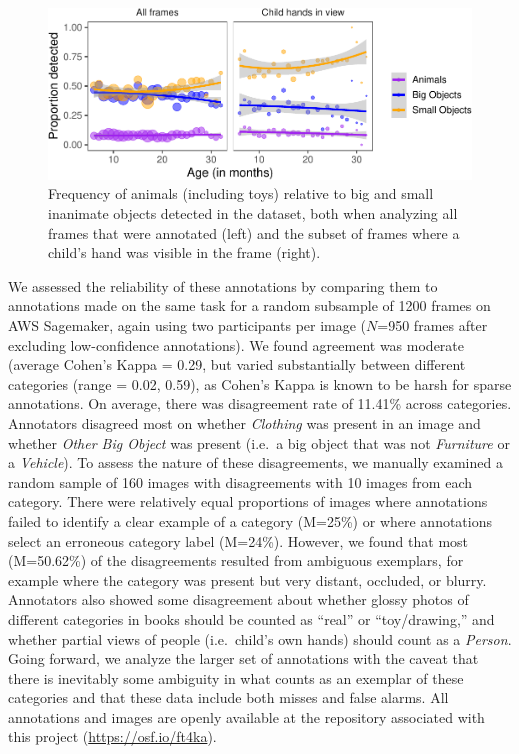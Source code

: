 \documentclass[10pt, letterpaper]{article}
\newenvironment{CodeChunk}{}{}
\begin{document}
\begin{CodeChunk}
\begin{figure}[h]

{\centering \includegraphics{figs/anim_size-1} 

}

\caption[Frequency of animals (including toys) relative to big and small inanimate objects detected in the dataset, both when analyzing all frames that were annotated (left) and the subset of frames where a child's hand was visible in the frame (right)]{Frequency of animals (including toys) relative to big and small inanimate objects detected in the dataset, both when analyzing all frames that were annotated (left) and the subset of frames where a child's hand was visible in the frame (right).}\label{fig:anim_size}
\end{figure}
\end{CodeChunk}

We assessed the reliability of these annotations by comparing them to
annotations made on the same task for a random subsample of 1200 frames
on AWS Sagemaker, again using two participants per image (\(N\)=950
frames after excluding low-confidence annotations). We found agreement
was moderate (average Cohen's Kappa = 0.29, but varied substantially
between different categories (range = 0.02, 0.59), as Cohen's Kappa is
known to be harsh for sparse annotations. On average, there was
disagreement rate of 11.41\% across categories. Annotators disagreed
most on whether \emph{Clothing} was present in an image and whether
\emph{Other Big Object} was present (i.e.~a big object that was not
\emph{Furniture} or a \emph{Vehicle}). To assess the nature of these
disagreements, we manually examined a random sample of 160 images with
disagreements with 10 images from each category. There were relatively
equal proportions of images where annotations failed to identify a clear
example of a category (M=25\%) or where annotations select an erroneous
category label (M=24\%). However, we found that most (M=50.62\%) of the
disagreements resulted from ambiguous exemplars, for example where the
category was present but very distant, occluded, or blurry. Annotators
also showed some disagreement about whether glossy photos of different
categories in books should be counted as ``real'' or ``toy/drawing,''
and whether partial views of people (i.e.~child's own hands) should
count as a \emph{Person}. Going forward, we analyze the larger set of
annotations with the caveat that there is inevitably some ambiguity in
what counts as an exemplar of these categories and that these data
include both misses and false alarms. All annotations and images are
openly available at the repository associated with this project
(\url{https://osf.io/ft4ka}).
\end{document}
